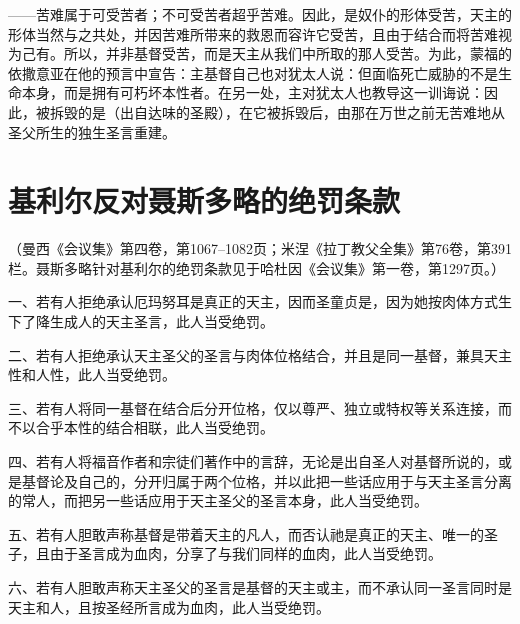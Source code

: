 ——苦难属于可受苦者；不可受苦者超乎苦难。因此，是奴仆的形体受苦，天主的形体当然与之共处，并因苦难所带来的救恩而容许它受苦，且由于结合而将苦难视为己有。所以，并非基督受苦，而是天主从我们中所取的那人受苦。为此，蒙福的依撒意亚在他的预言中宣告：主基督自己也对犹太人说：但面临死亡威胁的不是生命本身，而是拥有可朽坏本性者。在另一处，主对犹太人也教导这一训诲说：因此，被拆毁的是（出自达味的圣殿），在它被拆毁后，由那在万世之前无苦难地从圣父所生的独生圣言重建。\par


\section{基利尔反对聂斯多略的绝罚条款}

（曼西《会议集》第四卷，第1067–1082页；米涅《拉丁教父全集》第76卷，第391栏。聂斯多略针对基利尔的绝罚条款见于哈杜因《会议集》第一卷，第1297页。）\par

一、若有人拒绝承认厄玛努耳是真正的天主，因而圣童贞是，因为她按肉体方式生下了降生成人的天主圣言，此人当受绝罚。\par

二、若有人拒绝承认天主圣父的圣言与肉体位格结合，并且是同一基督，兼具天主性和人性，此人当受绝罚。\par

三、若有人将同一基督在结合后分开位格，仅以尊严、独立或特权等关系连接，而不以合乎本性的结合相联，此人当受绝罚。\par

四、若有人将福音作者和宗徒们著作中的言辞，无论是出自圣人对基督所说的，或是基督论及自己的，分开归属于两个位格，并以此把一些话应用于与天主圣言分离的常人，而把另一些话应用于天主圣父的圣言本身，此人当受绝罚。\par

五、若有人胆敢声称基督是带着天主的凡人，而否认祂是真正的天主、唯一的圣子，且由于圣言成为血肉，分享了与我们同样的血肉，此人当受绝罚。\par

六、若有人胆敢声称天主圣父的圣言是基督的天主或主，而不承认同一圣言同时是天主和人，且按圣经所言成为血肉，此人当受绝罚。\par

